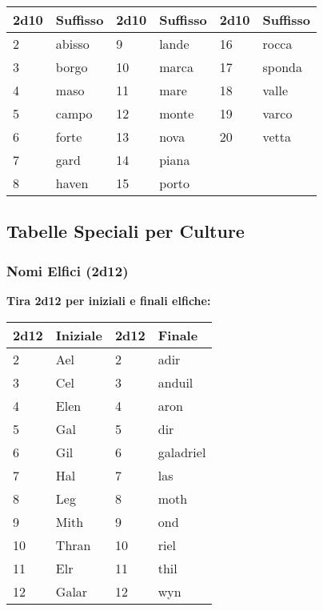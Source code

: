 \begin{multicols}{2}
{\noindent\begin{tabularx}{\linewidth}{X|l|X|l|X|l}
\toprule
 \rowcolor{gray!20}\textbf{2d10} & \textbf{Suffisso} & \textbf{2d10} & \textbf{Suffisso} & \textbf{2d10} & \textbf{Suffisso} \\
\toprule
	2 & abisso & 9 & lande & 16 & rocca \\
 \rowcolor{gray!20}3 & borgo & 10 & marca & 17 & sponda \\
	4 & maso & 11 & mare & 18 & valle \\
 \rowcolor{gray!20}5 & campo & 12 & monte & 19 & varco \\
	6 & forte & 13 & nova & 20 & vetta \\
 \rowcolor{gray!20}7 & gard & 14 & piana & & \\
	8 & haven & 15 & porto & & \\
\end{tabularx}


\subsection*{Tabelle Speciali per Culture}

\subsubsection*{Nomi Elfici (2d12)}
\textbf{Tira 2d12 per iniziali e finali elfiche:}

\noindent\begin{tabularx}{\linewidth}{X|l|X|l}
	\toprule
\rowcolor{gray!20}\textbf{2d12} & \textbf{Iniziale} & \textbf{2d12} & \textbf{Finale} \\
\toprule
2 & Ael & 2 & adir \\
\rowcolor{gray!20}3 & Cel & 3 & anduil \\
4 & Elen & 4 & aron \\
\rowcolor{gray!20}5 & Gal & 5 & dir \\
6 & Gil & 6 & galadriel \\
\rowcolor{gray!20}7 & Hal & 7 & las \\
8 & Leg & 8 & moth \\
\rowcolor{gray!20}9 & Mith & 9 & ond \\
10 & Thran & 10 & riel \\
\rowcolor{gray!20}11 & Elr & 11 & thil \\
12 & Galar & 12 & wyn \\
\end{tabularx}


}
\end{multicols}
